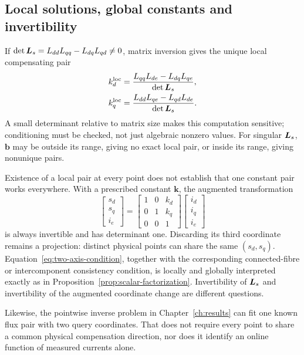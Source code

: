 \subsection{Local solutions, global constants and invertibility}
If $\det\bm L_s=L_{dd}L_{qq}-L_{dq}L_{qd}\ne0$, matrix inversion gives the unique local compensating pair
\begin{align}
k_d^{\rm loc}
&=\frac{L_{qq}L_{de}-L_{dq}L_{qe}}{\det\bm L_s},\\
k_q^{\rm loc}
&=\frac{L_{dd}L_{qe}-L_{qd}L_{de}}{\det\bm L_s}.
\end{align}
A small determinant relative to matrix size makes this computation sensitive; conditioning must be checked, not just algebraic nonzero values. For singular $\bm L_s$, $\bm b$ may be outside its range, giving no exact local pair, or inside its range, giving nonunique pairs.

Existence of a local pair at every point does not establish that one constant pair works everywhere. With a prescribed constant $\bm k$, the augmented transformation
\begin{equation}
\begin{bmatrix}s_d\\s_q\\i_e\end{bmatrix}
=
\begin{bmatrix}1&0&k_d\\0&1&k_q\\0&0&1\end{bmatrix}
\begin{bmatrix}i_d\\i_q\\i_e\end{bmatrix}
\end{equation}
is always invertible and has determinant one. Discarding its third coordinate remains a projection: distinct physical points can share the same $(s_d,s_q)$. Equation~\eqref{eq:two-axis-condition}, together with the corresponding connected-fibre or intercomponent consistency condition, is locally and globally interpreted exactly as in Proposition~\ref{prop:scalar-factorization}. Invertibility of $\bm L_s$ and invertibility of the augmented coordinate change are different questions.

Likewise, the pointwise inverse problem in Chapter~\ref{ch:results} can fit one known flux pair with two query coordinates. That does not require every point to share a common physical compensation direction, nor does it identify an online function of measured currents alone.

